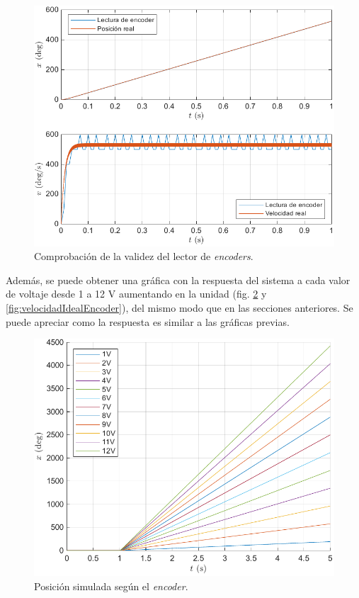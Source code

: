 \documentclass{article}
\begin{document}
\begin{figure}[H]
    \centering
    \includegraphics[width=0.75\linewidth]{img/comprobacionEncoders.pdf}
    \caption{Comprobación de la validez del lector de \textit{encoders}.}
    \label{fig:comprobacionEncoders}
\end{figure}

Además, se puede obtener una gráfica con la respuesta del sistema a cada valor de voltaje desde 1 a 12 V aumentando en la unidad (fig. \ref{fig:posicionIdealEncoder} y \ref{fig:velocidadIdealEncoder}), del mismo modo que en las secciones anteriores. Se puede apreciar como la respuesta es similar a las gráficas previas.

\begin{figure}[H]
    \centering
    \includegraphics[width=0.75\linewidth]{img/posicionIdealEncoder.pdf}
    \caption{Posición simulada según el \textit{encoder}.}
    \label{fig:posicionIdealEncoder}
\end{figure}
\end{document}
